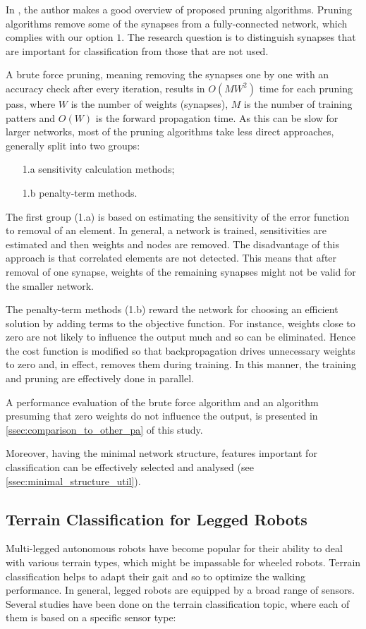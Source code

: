 In \citep{article:10:pa}, the author makes a good overview of proposed pruning algorithms. Pruning algorithms remove some of the synapses from a fully-connected network, which complies with our option $ 1 $. The research question is to distinguish synapses that are important for classification from those that are not used.

A brute force pruning, meaning removing the synapses one by one with an accuracy check after every iteration, results in $ O(MW^2) $ time for each pruning pass, where $ W $ is the number of weights (synapses), $ M $ is the number of training patters and $ O(W) $ is the forward propagation time. As this can be slow for larger networks, most of the pruning algorithms take less direct approaches, generally split into two groups:

\begin{enumerate}
\item[1.a] sensitivity calculation methods;
\item[1.b] penalty-term methods.
\end{enumerate}

The first group (1.a) is based on estimating the sensitivity of the error function to removal of an element. In general, a network is trained, sensitivities are estimated and then weights and nodes are removed. The disadvantage of this approach is that correlated elements are not detected. This means that after removal of one synapse, weights of the remaining synapses might not be valid for the smaller network.

The penalty-term methods (1.b) reward the network for choosing an efficient solution by adding terms to the objective function. For instance, weights close to zero are not likely to influence the output much and so can be eliminated. Hence the cost function is modified so that backpropagation drives unnecessary weights to zero and, in effect, removes them during training. In this manner, the training and pruning are effectively done in parallel.

A performance evaluation of the brute force algorithm and an algorithm presuming that zero weights do not influence the output, is presented in \cref{ssec:comparison_to_other_pa} of this study.

Moreover, having the minimal network structure, features important for classification can be effectively selected and analysed (see \cref{ssec:minimal_structure_util}). 

\subsection*{Terrain Classification for Legged Robots} \label{sec:soa_terrain_classification}
Multi-legged autonomous robots have become popular for their ability to deal with various terrain types, which might be impassable for wheeled robots. Terrain classification helps to adapt their gait and so to optimize the walking performance. In general, legged robots are equipped by a broad range of sensors. Several studies have been done on the terrain classification topic, where each of them is based on a specific sensor type:

